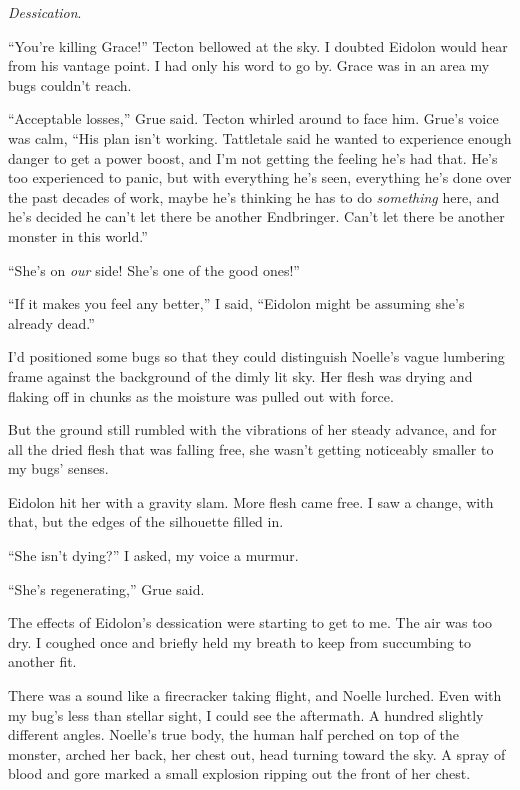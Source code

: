 \emph{Dessication}.



``You're killing Grace!'' Tecton bellowed at the sky.  I doubted Eidolon would hear from his vantage point.  I had only his word to go by.  Grace was in an area my bugs couldn't reach.



``Acceptable losses,'' Grue said.  Tecton whirled around to face him.  Grue's voice was calm, ``His plan isn't working.  Tattletale said he wanted to experience enough danger to get a power boost, and I'm not getting the feeling he's had that.  He's too experienced to panic, but with everything he's seen, everything he's done over the past decades of work, maybe he's thinking he has to do \emph{something} here, and he's decided he can't let there be another Endbringer.  Can't let there be another monster in this world.''



``She's on \emph{our} side!  She's one of the good ones!''



``If it makes you feel any better,'' I said, ``Eidolon might be assuming she's already dead.''



I'd positioned some bugs so that they could distinguish Noelle's vague lumbering frame against the background of the dimly lit sky.  Her flesh was drying and flaking off in chunks as the moisture was pulled out with force.



But the ground still rumbled with the vibrations of her steady advance, and for all the dried flesh that was falling free, she wasn't getting noticeably smaller to my bugs' senses.



Eidolon hit her with a gravity slam.  More flesh came free.  I saw a change, with that, but the edges of the silhouette filled in.



``She isn't dying?'' I asked, my voice a murmur.



``She's regenerating,'' Grue said.



The effects of Eidolon's dessication were starting to get to me.  The air was too dry.  I coughed once and briefly held my breath to keep from succumbing to another fit.



There was a sound like a firecracker taking flight, and Noelle lurched.  Even with my bug's less than stellar sight, I could see the aftermath.  A hundred slightly different angles.  Noelle's true body, the human half perched on top of the monster, arched her back, her chest out, head turning toward the sky.  A spray of blood and gore marked a small explosion ripping out the front of her chest.



